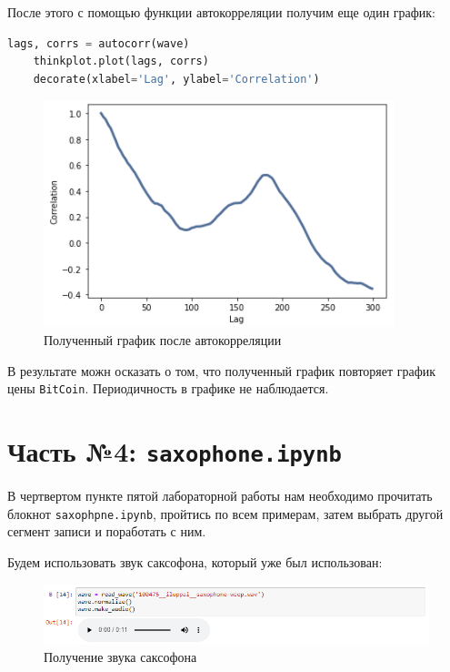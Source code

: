 \documentclass[a4paper]{article}
\begin{document}
            После этого с помощью функции автокорреляции получим еще один график:
            
\begin{lstlisting}[language=Python, caption= Получение нового графика после автокорреляции]
    lags, corrs = autocorr(wave)
    thinkplot.plot(lags, corrs)
    decorate(xlabel='Lag', ylabel='Correlation')
\end{lstlisting}               
            
            \begin{figure}[H]
                \centering
                \includegraphics{ex_3_autocorr.png}
                \caption{Полученный график после автокорреляции}
                \label{fig:ex_3_autocorr}
            \end{figure}
            
            В результате можн осказать о том, что полученный график повторяет график цены \texttt{BitCoin}. Периодичность в графике не наблюдается.
            
    \newpage
        \section{Часть №4: \texttt{saxophone.ipynb}}
            В чертвертом пункте пятой лабораторной работы нам необходимо прочитать блокнот \texttt{saxophpne.ipynb}, пройтись по всем примерам, затем выбрать другой сегмент записи и поработать с ним.
            
            Будем использовать звук саксофона, который уже был использован:
            
            \begin{figure}[H]
                \centering
                \includegraphics[width=\textwidth]{ex_4_wave_audio.png}
                \caption{Получение звука саксофона}
                \label{fig:ex_4_wave_audio}
            \end{figure}
            
\end{document}
